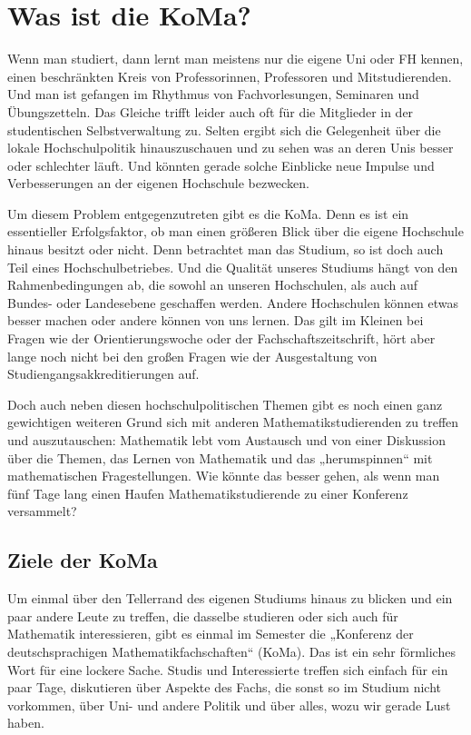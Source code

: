 \chapter{Was ist die KoMa?}

Wenn man studiert, dann lernt man meistens nur die eigene Uni oder FH kennen,
einen beschränkten Kreis von Professorinnen, Professoren und Mitstudierenden.
Und man ist gefangen im Rhythmus von Fachvorlesungen, Seminaren und
Übungszetteln.  Das Gleiche trifft leider auch oft für die Mitglieder in der
studentischen Selbstverwaltung zu. Selten ergibt sich die Gelegenheit über die
lokale Hochschulpolitik hinauszuschauen und zu sehen was an deren Unis besser
oder schlechter läuft. Und könnten gerade solche Einblicke neue Impulse und
Verbesserungen an der eigenen Hochschule bezwecken.

Um diesem Problem entgegenzutreten gibt es die KoMa. Denn es ist ein
essentieller Erfolgsfaktor, ob man einen größeren Blick über die eigene
Hochschule hinaus besitzt oder nicht. Denn betrachtet man das Studium, so ist
doch auch Teil eines Hochschulbetriebes. Und die Qualität unseres Studiums
hängt von den Rahmenbedingungen ab, die sowohl an unseren Hochschulen, als auch
auf Bundes- oder Landesebene geschaffen werden.  Andere Hochschulen können
etwas besser machen oder andere können von uns lernen. Das gilt im Kleinen bei
Fragen wie der Orientierungswoche oder der Fachschaftszeitschrift, hört aber
lange noch nicht bei den großen Fragen wie der Ausgestaltung von
Studiengangsakkreditierungen auf.

Doch auch neben diesen hochschulpolitischen Themen gibt es noch einen ganz
gewichtigen weiteren Grund sich mit anderen Mathematikstudierenden zu treffen
und auszutauschen: Mathematik lebt vom Austausch und von einer Diskussion über
die Themen, das Lernen von Mathematik und das „herumspinnen“ mit mathematischen
Fragestellungen. Wie könnte das besser gehen, als wenn man fünf Tage lang einen
Haufen Mathematikstudierende zu einer Konferenz versammelt?

\section{Ziele der KoMa}

Um einmal über den Tellerrand des eigenen Studiums hinaus zu blicken und ein
paar andere Leute zu treffen, die dasselbe studieren oder sich auch für
Mathematik interessieren, gibt es einmal im Semester die „Konferenz der
deutschsprachigen Mathematikfachschaften“ (KoMa). Das ist ein sehr förmliches
Wort für eine lockere Sache. Studis und Interessierte treffen sich einfach für
ein paar Tage, diskutieren über Aspekte des Fachs, die sonst so im Studium
nicht vorkommen, über Uni- und andere Politik und über alles, wozu wir gerade
Lust haben.

